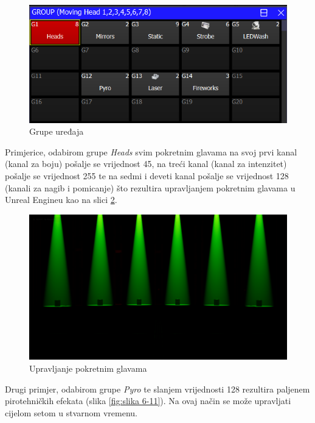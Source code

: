 \documentclass[times, utf8, zavrsni, numeric]{fer}
\begin{document}
\begin{figure}[htp]
	\centering
	\includegraphics[width=\linewidth]{slika 6-9.png}
	\caption{Grupe uređaja}
	\label{fig:slika 6-9}
\end{figure}

Primjerice, odabirom grupe \emph{Heads} svim pokretnim glavama na svoj prvi kanal (kanal za boju) pošalje se vrijednost 45, na treći kanal (kanal za intenzitet) pošalje se vrijednost 255 te na sedmi i deveti kanal pošalje se vrijednost 128 (kanali za nagib i pomicanje) što rezultira upravljanjem pokretnim glavama u Unreal Engineu kao na slici \ref{fig:slika 6-10}.

\begin{figure}[htp]
	\centering
	\includegraphics[width=\linewidth]{slika 6-10.png}
	\caption{Upravljanje pokretnim glavama}
	\label{fig:slika 6-10}
\end{figure}

Drugi primjer, odabirom grupe \emph{Pyro} te slanjem vrijednosti 128 rezultira paljenem pirotehničkih efekata (slika \ref{fig:slika 6-11}). Na ovaj način se može upravljati cijelom setom u stvarnom vremenu.
\end{document}
